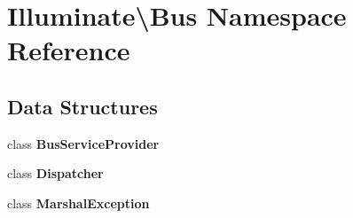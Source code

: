 \section{Illuminate\textbackslash{}Bus Namespace Reference}
\label{namespace_illuminate_1_1_bus}
\subsection*{Data Structures}
\begin{DoxyCompactItemize}
\item 
class {\bf Bus\+Service\+Provider}
\item 
class {\bf Dispatcher}
\item 
class {\bf Marshal\+Exception}
\end{DoxyCompactItemize}
